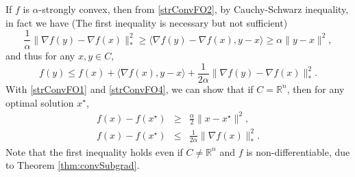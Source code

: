 \documentclass[openany]{book}
\theoremstyle{definition}
\theoremstyle{remark}
\begin{document}
If $f$ is $\alpha$-strongly convex, then from \eqref{strConvFO2}, by Cauchy-Schwarz inequality, in fact we have (The first inequality is necessary but not sufficient)
\begin{equation}
    \frac{1}{\alpha}\|\nabla f(y)-\nabla f(x)\|_*^2\ge \langle\nabla f(y)-\nabla f(x),y-x\rangle\ge\alpha\|y-x\|^2,
\end{equation}
and thus for any $x,y\in C$,
\begin{equation}\label{strConvFO4}
    f(y)\le f(x)+\langle\nabla f(x),y-x\rangle+\frac{1}{2\alpha}\|\nabla f(y)-\nabla f(x)\|_*^2.
\end{equation}
With \eqref{strConvFO1} and \eqref{strConvFO4}, we can show that if $C=\mathbb{R}^n$, then for any optimal solution $x^{\star}$,
\begin{eqnarray}
    f(x)-f(x^{\star}) & \ge & \frac{\alpha}{2}\|x-x^{\star}\|^2, \\
    f(x)-f(x^{\star}) & \le & \frac{1}{2\alpha}\|\nabla f(x)\|_*^2.
\end{eqnarray}
Note that the first inequality holds even if $C\ne \mathbb{R}^n$ and $f$ is non-differentiable, due to Theorem \ref{thm:convSubgrad}.
\end{document}
